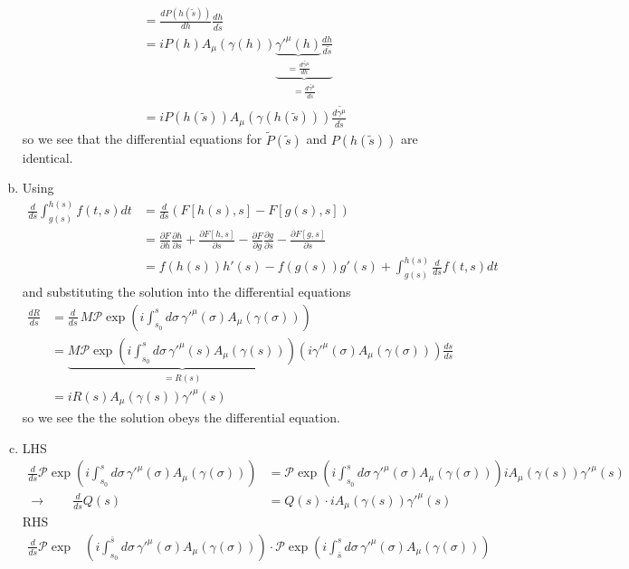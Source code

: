 \documentclass[10pt,a4paper]{article}
\theoremstyle{definition}
\begin{document}
\begin{enumerate}[a.)]
\begin{align}
&=\frac{dP(h(\tilde{s}))}{dh}\frac{dh}{d\tilde{s}}\\
&=i P(h) A_\mu(\gamma(h)) \underbrace{\underbrace{\gamma'^\mu(h)}_{=\frac{d\tilde{\gamma^\mu}}{dh}}\frac{dh}{d\tilde{s}}}_{=\frac{d\tilde{\gamma^\mu}}{d\tilde{s}}}\\
&=i P(h(\tilde{s})) A_\mu(\gamma(h(\tilde{s})))\frac{d\tilde{\gamma^\mu}}{d\tilde{s}}
\end{align}
so we see that the differential equations for $\tilde{P}(\tilde{s})$ and $P(h(\tilde{s}))$ are identical.
\item Using
\begin{align}
\frac{d}{ds}\int_{g(s)}^{h(s)}f(t,s)dt
&=\frac{d}{ds}\left(F[h(s),s]-F[g(s),s]\right)\\
&=\frac{\partial F}{\partial h}\frac{\partial h}{\partial s}+\frac{\partial F[h,s]}{\partial s}-\frac{\partial F}{\partial g}\frac{\partial g}{\partial s}-\frac{\partial F[g,s]}{\partial s}\\
&=f(h(s))h'(s) - f(g(s))g'(s)+\int_{g(s)}^{h(s)}\frac{d}{ds}f(t,s)dt
\end{align}
and substituting the solution into the differential equations 
\begin{align}
\frac{dR}{ds}
&=\frac{d}{ds}\,M\mathcal{P}\exp\left(i\int_{s_0}^s d\sigma\,\gamma'^{\mu}(\sigma)A_\mu(\gamma(\sigma))\right)\\
&=\underbrace{M\mathcal{P}\exp\left(i\int_{s_0}^s d\sigma\,\gamma'^{\mu}(s)A_\mu(\gamma(s))\right)}_{=R(s)}(i \gamma'^{\mu}(\sigma)A_\mu(\gamma(\sigma)))\frac{ds}{ds}\\
&=iR(s)A_\mu(\gamma(s))\gamma'^{\mu}(s)
\end{align} 
so we see the the solution obeys the differential equation.
\item LHS
\begin{align}
\frac{d}{ds}\mathcal{P}\exp\left(i\int_{s_0}^s d\sigma\,\gamma'^{\mu}(\sigma)A_\mu(\gamma(\sigma))\right)
&=\mathcal{P}\exp\left(i\int_{s_0}^s d\sigma\,\gamma'^{\mu}(\sigma)A_\mu(\gamma(\sigma))\right)iA_\mu(\gamma(s))\gamma'^{\mu}(s)\\
\rightarrow\qquad\frac{d}{ds}Q(s)
&=Q(s)\cdot iA_\mu(\gamma(s))\gamma'^{\mu}(s)
\end{align}
RHS
\begin{align}
\frac{d}{ds}\mathcal{P} \exp &\left( i \int_{s_0}^{\bar{s}} d\sigma\, \gamma'^\mu(\sigma) A_\mu(\gamma(\sigma)) \right)
\cdot
\mathcal{P} \exp \left( i \int_{\bar{s}}^{s} d\sigma\, \gamma'^\mu(\sigma) A_\mu(\gamma(\sigma)) \right)\\

\end{align}
\end{enumerate}
\end{document}
